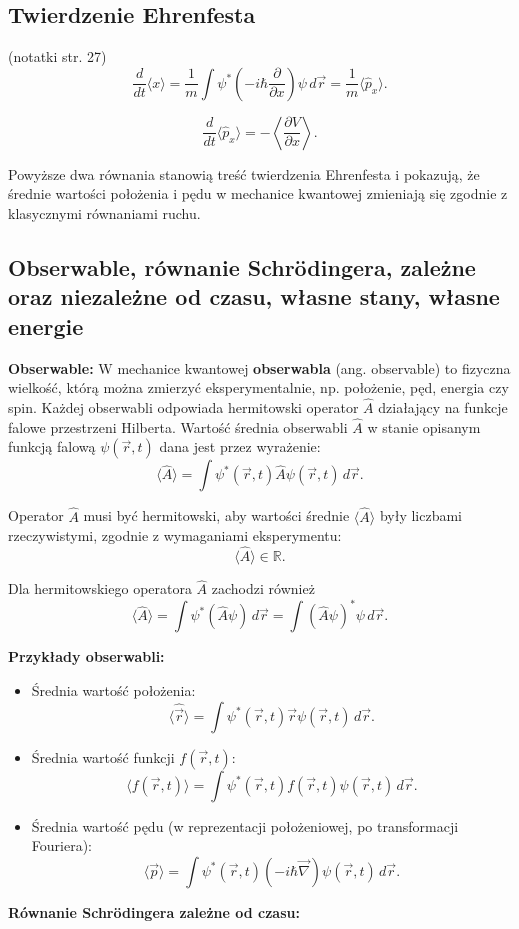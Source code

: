 \subsection{Twierdzenie Ehrenfesta}
(notatki str. 27)
$$
\frac{d}{dt} \langle x \rangle = \frac{1}{m} \int \psi^* \left(-i\hbar \frac{\partial}{\partial x}\right) \psi \, d\vec{r} = \frac{1}{m} \langle \hat{p}_x \rangle.
$$

$$
\frac{d}{dt} \langle \hat{p}_x \rangle = - \left\langle \frac{\partial V}{\partial x} \right\rangle.
$$

Powyższe dwa równania stanowią treść twierdzenia Ehrenfesta i pokazują, że średnie wartości położenia i pędu w mechanice kwantowej zmieniają się zgodnie z klasycznymi równaniami ruchu. 


\subsection{Obserwable, równanie Schrödingera, zależne oraz niezależne od czasu, własne stany, własne energie}

\textbf{Obserwable:}
W mechanice kwantowej \textbf{obserwabla} (ang. observable) to fizyczna wielkość, którą można zmierzyć eksperymentalnie, np. położenie, pęd, energia czy spin. Każdej obserwabli odpowiada hermitowski operator $\hat{A}$ działający na funkcje falowe przestrzeni Hilberta. Wartość średnia obserwabli $\hat{A}$ w stanie opisanym funkcją falową $\psi(\vec{r}, t)$ dana jest przez wyrażenie:
$$
\langle \hat{A} \rangle = \int \psi^*(\vec{r}, t) \hat{A} \psi(\vec{r}, t) \, d\vec{r}.
$$

Operator $\hat{A}$ musi być hermitowski, aby wartości średnie $\langle \hat{A} \rangle$ były liczbami rzeczywistymi, zgodnie z wymaganiami eksperymentu:
$$
\langle \hat{A} \rangle \in \mathbb{R}.
$$

Dla hermitowskiego operatora $\hat{A}$ zachodzi również
$$
\langle \hat{A} \rangle = \int \psi^* (\hat{A} \psi) \, d\vec{r} = \int (\hat{A} \psi)^* \psi \, d\vec{r}.
$$

\textbf{Przykłady obserwabli:}

\begin{itemize}
    \item Średnia wartość położenia:
    $$
    \langle \hat{\vec{r}} \rangle = \int \psi^*(\vec{r}, t) \vec{r} \psi(\vec{r}, t) \, d\vec{r}.
    $$

    \item Średnia wartość funkcji $f(\vec{r}, t)$:
    $$
    \langle f(\vec{r}, t) \rangle = \int \psi^*(\vec{r}, t) f(\vec{r}, t) \psi(\vec{r}, t) \, d\vec{r}.
    $$

    \item Średnia wartość pędu (w reprezentacji położeniowej, po transformacji Fouriera):
    $$
    \langle \vec{p} \rangle = \int \psi^*(\vec{r}, t) \left( -i\hbar \vec{\nabla} \right) \psi(\vec{r}, t) \, d\vec{r}.
    $$
\end{itemize}
\textbf{Równanie Schrödingera zależne od czasu:}

